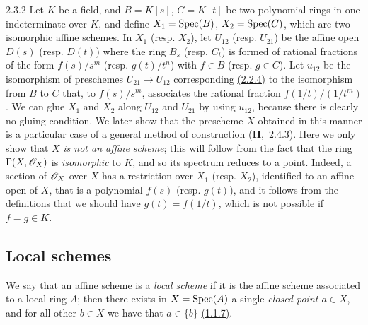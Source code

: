 \begin{env}[Example]{2.3.2}
\label{exm-1.2.3.2}
Let $K$ be a field, and $B=K[s]$, $C=K[t]$ be two polynomial rings in one indeterminate over
$K$, and define $X_1={\mathop{\mathrm{Spec}}\nolimits}(B)$, $X_2={\mathop{\mathrm{Spec}}\nolimits}(C)$, which are two isomorphic affine schemes. In
$X_1$ (resp. $X_2$), let $U_{12}$ (resp. $U_{21}$) be the affine open $D(s)$ (resp. $D(t)$)
where the ring $B_s$ (resp. $C_t$) is formed of rational fractions of the form $f(s)/s^m$
(resp. $g(t)/t^n$) with $f\in B$ (resp. $g\in C$). Let $u_{12}$ be the isomorphism of
preschemes $U_{21}\to U_{12}$ corresponding \hyperref[prop-1.2.2.4]{(2.2.4)} to the isomorphism from $B$ to
$C$ that, to $f(s)/s^m$, associates the rational fraction $f(1/t)/(1/t^m)$. We can glue $X_1$
and $X_2$ along $U_{12}$ and $U_{21}$ by using $u_{12}$, because there is clearly no gluing
condition. We later show that the prescheme $X$ obtained in this manner is a particular case
of a general method of construction (\textbf{II},~2.4.3). Here we only show that $X$ {\em is
not an affine scheme}; this will follow from the fact that the ring $\Gamma(X,\mathscr{O}_X)$ is
{\em isomorphic} to $K$, and so its spectrum reduces to a point. Indeed, a section of
$\mathscr{O}_X$ over $X$ has a restriction over $X_1$ (resp. $X_2$), identified to an affine open of
$X$, that is a polynomial $f(s)$ (resp. $g(t)$), and it follows from the definitions that we
should have $g(t)=f(1/t)$, which is not possible if $f=g\in K$.
\end{env}

\subsection{Local schemes}
\label{subsection-local-schemes}

\begin{env}[2.4.1]
\label{env-1.2.4.1}
We say that an affine scheme is a {\em local scheme} if
it is the affine scheme associated to a local ring $A$; then there exists in
$X={\mathop{\mathrm{Spec}}\nolimits}(A)$ a single {\em closed point $a\in X$}, and for all other $b\in X$
we have that $a\in\overline{\{b\}}$ \hyperref[cor-1.1.1.7]{(1.1.7)}.
\end{env}

